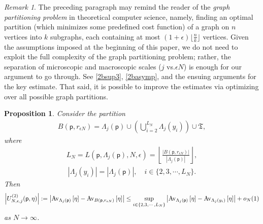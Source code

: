 \documentclass[11pt]{amsart}
\theoremstyle{plain}
\newtheorem{proposition}[lemma]{Proposition}
\theoremstyle{definition}
\theoremstyle{remark}
\newtheorem{remark}[lemma]{Remark}
\begin{document}
\begin{remark}
The preceding paragraph may remind the reader of the \emph{graph partitioning problem} in theoretical computer science, namely, finding an optimal partition (which minimizes some predefined cost function) of a graph on $n$ vertices into $k$ subgraphs, each containing at most $(1+\epsilon)\lfloor \frac{n}{k}\rfloor$ vertices. Given the assumptions imposed at the beginning of this paper, we do not need to exploit the full complexity of the graph partitioning problem; rather, the separation of microscopic and macroscopic scales ($j$ vs.\@ $\epsilon N$) is enough for our argument to go through. See \eqref{2bsup3}, \eqref{2basymp}, and the ensuing arguments for the key estimate. That said, it is possible to improve the estimates via optimizing over all possible graph partitions.
\end{remark}

\begin{proposition}
\label{prop:goodavg}
Consider the partition
\begin{align*}
B({\mathsf{p}},r_{\epsilon N}) = \Lambda_j({\mathsf{p}}) \cup \left(\bigcup_{i=2}^{L_N} \Lambda_j(y_i) \right) \cup \mathfrak{T},
\end{align*}
where
\begin{align*}
L_N = L({\mathsf{p}},\Lambda_j({\mathsf{p}}), N, \epsilon) = \left\lfloor \frac{|B({\mathsf{p}},r_{\epsilon N})|}{|\Lambda_j({\mathsf{p}})|} \right\rfloor,
\end{align*}
\begin{align*}
|\Lambda_j(y_i)| = |\Lambda_j({\mathsf{p}})|, \quad i\in\{2,3,\cdots, L_N\}.
\end{align*}
Then
\begin{align*}
\left|{U^{(2)}_{{{N}},{{\epsilon}},{{j}}}}({\mathsf{p}},\eta)\right|:=\left|{{\rm Av}_{{\Lambda_j({\mathsf{p}})}}\left[{{\eta}}\right]} - {{\rm Av}_{{B({\mathsf{p}}, r_{\epsilon N})}}\left[{{\eta}}\right]}\right| \leq \sup_{i\in \{2,3,\cdots, L_N\}} \left|{{\rm Av}_{{\Lambda_j({\mathsf{p}})}}\left[{{\eta}}\right]} - {{\rm Av}_{{\Lambda_j(y_i)}}\left[{{\eta}}\right]}\right| + o_N(1)
\end{align*}
as $N\to\infty$.
\end{proposition}
\end{document}
